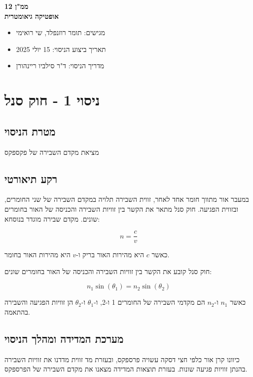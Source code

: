 \documentclass[14pt]{extarticle}
\begin{document}
\begin{center}
    {\LARGE \textbf{ממ"ן 12}}\\
    {\textbf{אופטיקה גיאומטרית}}
\end{center}

\begin{itemize}
    \item מגישים: תומר רוזנפלד, שי רואימי
    \item תאריך ביצוע הניסוי: 15 יולי 2025
    \item מדריך הניסוי: ד"ר סילביו ריינהורן
\end{itemize}
\newpage
\section*{ניסוי 1 - חוק סנל}
\subsection*{מטרת הניסוי}
מציאת מקדם השבירה של פקספקס 

\subsection*{רקע תיאורטי}
במעבר אור מתווך חומר אחד לאחר, זווית השבירה תלויה במקדם השבירה של שני החומרים, ובזווית הפגיעה.
חוק סנל מתאר את הקשר בין זוויות השבירה והכניסה של האור בחומרים שונים.
מקדם שבירה מוגדר בנוסחא:

\begin{equation}
    n = \frac{c}{v}
\end{equation}

כאשר $c$ היא מהירות האור בריק ו-$v$ היא מהירות האור בחומר.


חוק סנל קובע את הקשר בין זוויות השבירה והכניסה של האור בחומרים שונים:

\begin{equation}
n_1 \sin(\theta_1) = n_2 \sin(\theta_2)
\end{equation}

כאשר $n_1$ ו-$n_2$ הם מקדמי השבירה של החומרים 1 ו-2, ו-$\theta_1$ ו-$\theta_2$ הן זוויות הפגיעה והשבירה בהתאמה.

\subsection*{מערכת המדידה ומהלך הניסוי}

כיוונו קרן אור כלפי חצי דסקה עשויה פרספקס, ובעזרת מד זווית מדדנו את זוויות השבירה בהנתן זוויות פגיעה שונות. בעזרת תוצאות המדידה מצאנו את מקדם השבירה של הפרספקס.
\end{document}
